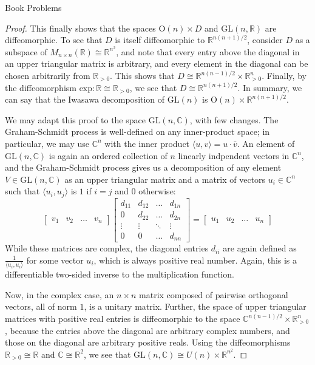 \documentclass[12pt]{article}
\newcommand{\R}{\mathbb{R}}
\newcommand{\C}{\mathbb{C}}
\theoremstyle{definition}
\begin{document}
\begin{section}{Book Problems}
\begin{proof}
 \par This finally shows that the spaces $\text{O}(n) \times D$ and $\text{GL}(n, \R)$ are diffeomorphic. To see that $D$ is itself diffeomorphic to $\R^{n(n+1)/2}$, consider $D$ as a subspace of $M_{n\times n}(\R) \cong \R^{n^2}$, and note that every entry above the diagonal in an upper triangular matrix is arbitrary, and every element in the diagonal can be chosen arbitrarily from $\R_{>0}$. This shows that $D \cong \R^{n(n-1)/2} \times \R_{>0}^n$. Finally, by the diffeomorphism $\text{exp}: \R \cong \R_{>0}$, we see that $D \cong \R^{n(n+1)/2}$. In summary, we can say that the Iwasawa decomposition of $\text{GL}(n)$ is $\text{O}(n) \times \R^{n(n+1)/2}$.
 \par We may adapt this proof to the space $\text{GL}(n, \C)$, with few changes. The Graham-Schmidt process is well-defined on any inner-product space; in particular, we may use $\C^n$ with the inner product $\langle u, v\rangle = u \cdot \bar{v}$. An element of $\text{GL}(n, \C)$ is again an ordered collection of $n$ linearly indpendent vectors in $\C^n$, and the Graham-Schmidt process gives us a decomposition of any element $V \in \text{GL}(n, \C)$ as an upper triangular matrix and a matrix of vectors $u_i \in \C^n$ such that $\langle u_i, u_j\rangle$ is $1$ if $i = j$ and $0$ otherwise:
 \[\begin{bmatrix}
		 v_1 & v_2 & \dots & v_n
	 \end{bmatrix}\begin{bmatrix}
		 d_{11} & d_{12} & \dots & d_{1n}\\
		 0 &  d_{22} & \dots & d_{2n}\\
		 \vdots & \vdots & \ddots & \vdots \\
		 0 & 0 & \dots & d_{nn}
	 \end{bmatrix} = \begin{bmatrix}
		 u_1 & u_2 & \dots & u_n
 \end{bmatrix}\]
 While these matrices are complex, the diagonal entries $d_{ii}$ are again defined as $\frac{1}{\langle u_i, u_i\rangle}$ for some vector $u_i$, which is always positive real number. Again, this is a differentiable two-sided inverse to the multiplication function.
 \par Now, in the complex case, an $n \times n$ matrix composed of pairwise orthogonal vectors, all of norm $1$, is a unitary matrix. Further, the space of upper triangular matrices with positive real entries is diffeomorphic to the space $\C^{n(n-1)/2} \times \R_{>0}^n$, because the entries above the diagonal are arbitrary complex numbers, and those on the diagonal are arbitrary positive reals. Using the diffeomorphisms $\R_{> 0} \cong \R$ and $\C \cong \R^2$, we see that $\text{GL}(n, \C) \cong U(n) \times \R^{n^2}$.

\end{proof}
\end{section}
\end{document}
